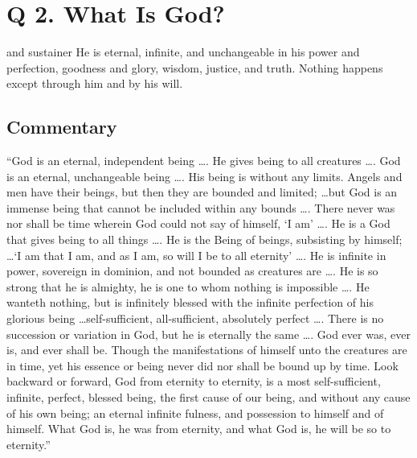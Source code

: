 \documentclass[00-main.tex]{subfiles}
\begin{document}
\section{Q 2. What Is God?}

and sustainer  He is eternal, infinite, and unchangeable in his power and perfection, goodness and glory, wisdom, justice, and truth. Nothing happens except through him and by his will.


\subsection{Commentary}

``God is an eternal, independent being \dots. He gives being to all creatures \dots. God is an eternal, unchangeable being \dots. His being is without any limits. Angels and men have their beings, but then they are bounded and limited; \dots but God is an immense being that cannot be included within any bounds \dots. There never was nor shall be time wherein God could not say of himself, `I am' \dots. He is a God that gives being to all things \dots. He is the Being of beings, subsisting by himself; \dots `I am that I am, and as I am, so will I be to all eternity' \dots. He is infinite in power, sovereign in dominion, and not bounded as creatures are \dots. He is so strong that he is almighty, he is one to whom nothing is impossible \dots. He wanteth nothing, but is infinitely blessed with the infinite perfection of his glorious being \dots self-sufficient, all-sufficient, absolutely perfect \dots. There is no succession or variation in God, but he is eternally the same \dots. God ever was, ever is, and ever shall be. Though the manifestations of himself unto the creatures are in time, yet his essence or being never did nor shall be bound up by time. Look backward or forward, God from eternity to eternity, is a most self-sufficient, infinite, perfect, blessed being, the first cause of our being, and without any cause of his own being; an eternal infinite fulness, and possession to himself and of himself. What God is, he was from eternity, and what God is, he will be so to eternity.''
\end{document}
